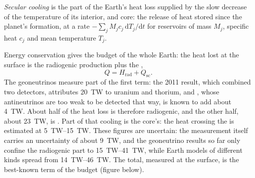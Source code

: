 \begin{definition}\label{def:b1:heat-budget:secular-cooling}
\emph{Secular cooling} is the part of the Earth's heat
loss supplied by the slow decrease of the temperature of its interior, 
and core: the release of heat stored since the planet's formation, at a rate
$-\sum_j M_j c_j\,\mathrm dT_j/\mathrm dt$ for reservoirs of mass $M_j$,
specific heat $c_j$ and mean temperature $T_j$.
\end{definition}

Energy conservation gives the budget of the whole Earth: the heat lost at the
surface is the radiogenic production plus the ,
\[
  Q = H_{\text{rad}} + Q_{\text{sc}} .
\]
The geoneutrinos measure part of the first term: the 2011 result, which
combined two detectors, attributes \qty{20}{TW} to uranium and thorium, and
, whose antineutrinos are too weak to be detected that way, is
known to add about \qty{4}{TW}.
About half of the heat loss is therefore radiogenic, and the other half,
about \qty{23}{TW}, is . Part of that cooling is the core's: the
heat crossing the  is estimated at \qtyrange{5}{15}{TW}.
These figures are uncertain: the measurement itself carries an uncertainty of
about \qty{9}{TW}, and the geoneutrino results so far only confine the
radiogenic part to \qtyrange{15}{41}{TW}, while Earth models of different
kinds spread from \qtyrange{14}{46}{TW}. The total, measured at the surface,
is the best-known term of the budget (figure below).

